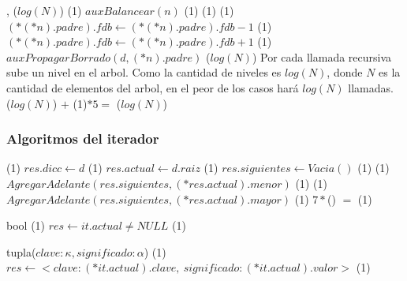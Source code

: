 {   ,
    }
{}
{\bigo($log(N)$)}
{                             \comment \bigo(1)
        \State $auxBalancear(n)$                                        \comment \bigo(1)
    \EndIf
                                           \comment \bigo(1)
                                        \comment \bigo(1)
            \State $(*(*n).padre).fdb \gets (*(*n).padre).fdb - 1$      \comment \bigo(1)
        \Else
            \State $(*(*n).padre).fdb \gets (*(*n).padre).fdb + 1$      \comment \bigo(1)
        \EndIf
        \State $auxPropagarBorrado(d, (*n).padre)$                      \comment \bigo($log(N)$)
    \EndIf
}
{   Por cada llamada recursiva sube un nivel en el arbol. Como la cantidad de niveles es
    $log(N)$, donde $N$ es la cantidad de elementos del arbol, en el peor de los casos
    hará $log(N)$ llamadas. \\
    \hspace*{8em} \bigo($log(N)$) $+$ \bigo(1)$*5 =$ \bigo($log(N)$) }


\subsubsection{Algoritmos del iterador}

{   }
{}
{\bigo(1)}
{   \State $res.dicc \gets d$                                           \comment \bigo(1)
    \State $res.actual \gets d.raiz$                                    \comment \bigo(1)
    \State $res.siguientes \gets Vacia()$                               \comment \bigo(1)
                                   \comment \bigo(1)
        \State $AgregarAdelante(res.siguientes, (*res.actual).menor)$   \comment \bigo(1)
    \EndIf
                                   \comment \bigo(1)
        \State $AgregarAdelante(res.siguientes, (*res.actual).mayor)$   \comment \bigo(1)
    \EndIf 
}
{   $7*$\bigo() $=$ \bigo(1) 
}

{   }
{bool}
{\bigo(1)}
{   \State $res \gets it.actual \neq NULL$      \comment \bigo(1)
}
{}

{   }
{tupla($clave: \kappa, significado: \alpha$)}
{\bigo(1)}
{   \State $res \gets <clave: (*it.actual).clave,\ significado: (*it.actual).valor>$      \comment \bigo(1)
}
{}


